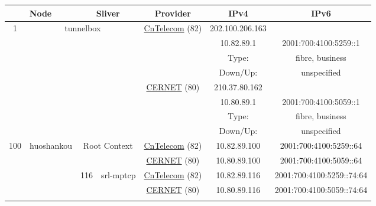 \begin{small}
\begin{center}
\begin{longtable}{|c|c|c|c|c|c|c|c|}
 \multicolumn{2}{|p{8em}|}{Node} & \multicolumn{2}{|p{8em}|}{Sliver} & \multicolumn{2}{|p{8em}|}{Provider} & IPv4 & IPv6 \\ \hline
\endhead
 \multirow{8}{*}{\tiny{1}} & \multicolumn{3}{|c|}{\multirow{8}{*}{\tiny{tunnelbox}}} & \multicolumn{2}{|c|}{\multirow{4}{*}{\tiny{\href{http://www.chinatelecom.com.cn}{CnTelecom} (82)}}} & \tiny{202.100.206.163} & \frownie{} \\* \cline{7-7}\cline{8-8}
  & \multicolumn{3}{|c|}{} & \multicolumn{2}{|c|}{} & \tiny{10.82.89.1} & \tiny{2001:700:4100:5259::1} \\* \cline{7-7}\cline{8-8}
  & \multicolumn{3}{|c|}{} & \multicolumn{2}{|c|}{} & Type: & fibre, business \\* \cline{7-7}\cline{8-8}
  & \multicolumn{3}{|c|}{} & \multicolumn{2}{|c|}{} & Down/Up:  & unspecified \\* \cline{5-5}\cline{6-6}\cline{7-7}\cline{8-8}
  & \multicolumn{3}{|c|}{} & \multicolumn{2}{|c|}{\multirow{4}{*}{\tiny{\href{http://www.cernet.edu.cn}{CERNET} (80)}}} & \tiny{210.37.80.162} & \frownie{} \\* \cline{7-7}\cline{8-8}
  & \multicolumn{3}{|c|}{} & \multicolumn{2}{|c|}{} & \tiny{10.80.89.1} & \tiny{2001:700:4100:5059::1} \\* \cline{7-7}\cline{8-8}
  & \multicolumn{3}{|c|}{} & \multicolumn{2}{|c|}{} & Type: & fibre, business \\* \cline{7-7}\cline{8-8}
  & \multicolumn{3}{|c|}{} & \multicolumn{2}{|c|}{} & Down/Up:  & unspecified \\ \hline
 \multirow{24}{*}{\tiny{100}} & \multicolumn{1}{|l|}{\multirow{24}{*}{\tiny{huoshankou}}} & \multicolumn{2}{|c|}{\multirow{2}{*}{\tiny{Root Context}}} & \multicolumn{2}{|c|}{\tiny{\href{http://www.chinatelecom.com.cn}{CnTelecom} (82)}} & \tiny{10.82.89.100} & \tiny{2001:700:4100:5259::64} \\* \cline{5-5}\cline{6-6}\cline{7-7}\cline{8-8}
  &  & \multicolumn{2}{|c|}{} & \multicolumn{2}{|c|}{\tiny{\href{http://www.cernet.edu.cn}{CERNET} (80)}} & \tiny{10.80.89.100} & \tiny{2001:700:4100:5059::64} \\* \cline{3-3}\cline{4-4}\cline{5-5}\cline{6-6}\cline{7-7}\cline{8-8}
  &  & \multirow{2}{*}{\tiny{116}} & \multicolumn{1}{|l|}{\multirow{2}{*}{\tiny{srl-mptcp}}} & \multicolumn{2}{|c|}{\tiny{\href{http://www.chinatelecom.com.cn}{CnTelecom} (82)}} & \tiny{10.82.89.116} & \tiny{2001:700:4100:5259::74:64} \\* \cline{5-5}\cline{6-6}\cline{7-7}\cline{8-8}
  &  &  &  & \multicolumn{2}{|c|}{\tiny{\href{http://www.cernet.edu.cn}{CERNET} (80)}} & \tiny{10.80.89.116} & \tiny{2001:700:4100:5059::74:64} \\* \cline{3-3}\cline{4-4}\cline{5-5}\cline{6-6}\cline{7-7}\cline{8-8}

\end{longtable}
\end{center}
\end{small}
